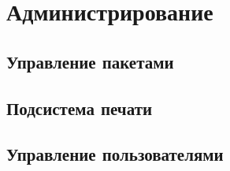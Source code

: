 \chapter{Администрирование}
\section{Управление пакетами}
\section{Подсистема печати}
\section{Управление пользователями}
